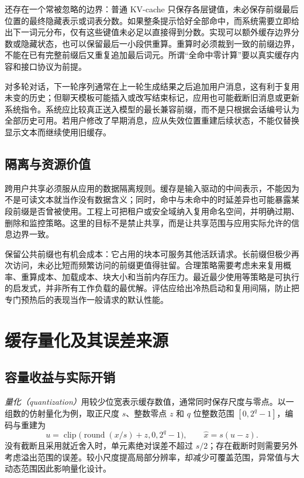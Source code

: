 \documentclass[UTF8,12pt,a4paper,fontset=fandol]{ctexart}
\begin{document}
还存在一个常被忽略的边界：普通 KV-cache 只保存各层键值，未必保存前缀最后位置的最终隐藏表示或词表分数。如果整条提示恰好全部命中，而系统需要立即给出下一词元分布，仅有这些键值未必足以直接得到分数。实现可以额外缓存边界分数或隐藏状态，也可以保留最后一小段供重算。重算时必须裁到一致的前缀边界，不能在已有完整前缀后又重复追加最后词元。所谓“全命中零计算”要以真实缓存内容和接口协议为前提。

对多轮对话，下一轮序列通常在上一轮生成结果之后追加用户消息，这有利于复用未变的历史；但聊天模板可能插入或改写结束标记，应用也可能截断旧消息或更新系统指令。系统应比较真正送入模型的最长兼容前缀，而不是只根据会话编号认为全部历史可用。若用户修改了早期消息，应从失效位置重建后续状态，不能仅替换显示文本而继续使用旧缓存。

\subsection{隔离与资源价值}

跨用户共享必须服从应用的数据隔离规则。缓存是输入驱动的中间表示，不能因为不是可读文本就当作没有数据含义；同时，命中与未命中的时延差异也可能暴露某段前缀是否曾被使用。工程上可把租户或安全域纳入复用命名空间，并明确过期、删除和监控策略。这里的目标不是禁止共享，而是让共享范围与应用实际允许的信息边界一致。

保留公共前缀也有机会成本：它占用的块本可服务其他活跃请求。长前缀但极少再次访问，未必比短而频繁访问的前缀更值得驻留。合理策略需要考虑未来复用概率、重算成本、加载成本、块大小和当前内存压力。最近最少使用等策略是可执行的启发式，并非所有工作负载的最优解。评估应给出冷热启动和复用间隔，防止把专门预热后的表现当作一般请求的默认性能。

\section{缓存量化及其误差来源}
\label{sec:kv-quantization}

\subsection{容量收益与实际开销}

\emph{量化（quantization）}用较少位宽表示缓存数值，通常同时保存尺度与零点。以一组数的仿射量化为例，取正尺度 $s$、整数零点 $z$ 和 $q$ 位整数范围 $[0,2^q-1]$，编码与重建为
\begin{equation}
 u=\operatorname{clip}\bigl(\operatorname{round}(x/s)+z,0,2^q-1\bigr),
 \qquad \widehat x=s(u-z).
 \label{eq:kv-quantization}
\end{equation}
没有截断且采用就近舍入时，单元素绝对误差不超过 $s/2$；存在截断时则需要另外考虑溢出范围的误差。较小尺度提高局部分辨率，却减少可覆盖范围，异常值与大动态范围因此影响量化设计。
\end{document}
